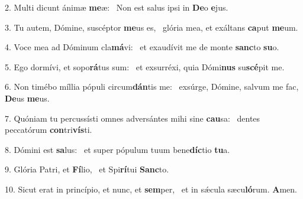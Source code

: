 2. Multi dicunt ánimæ \textbf{me}æ: \ast\  Non est salus ipsi in \textbf{De}o \textbf{e}jus.\

3. Tu autem, Dómine, suscéptor \textbf{me}us es, \ast\  glória mea, et exáltans \textbf{ca}put \textbf{me}um.\

4. Voce mea ad Dóminum cla\textbf{má}vi: \ast\  et exaudívit me de monte \textbf{sanc}to \textbf{su}o.\

5. Ego dormívi, et sopo\textbf{rá}tus sum: \ast\  et exsurréxi, quia Dómi\textbf{nus} su\textbf{scé}pit me.\

6. Non timébo míllia pópuli circum\textbf{dán}tis me: \ast\  exsúrge, Dómine, salvum me fac, \textbf{De}us \textbf{me}us.\

7. Quóniam tu percussísti omnes adversántes mihi sine \textbf{cau}sa: \ast\  dentes peccatórum \textbf{con}tri\textbf{vís}ti.\

8. Dómini est \textbf{sa}lus: \ast\  et super pópulum tuum bene\textbf{díc}tio \textbf{tu}a.\

9. Glória Patri, et \textbf{Fí}lio, \ast\  et Spi\textbf{rí}tui \textbf{Sanc}to.\

10. Sicut erat in princípio, et nunc, et \textbf{sem}per, \ast\  et in sǽcula sæcu\textbf{ló}rum. \textbf{A}men.\

